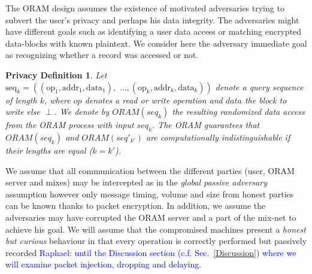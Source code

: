 \documentclass{llncs}
\newtheorem{privdef}{Privacy Definition}
\newcommand{\raphael}[1]{\textcolor{blue}{Raphael: #1}}
\begin{document}
The ORAM design assumes the existence of motivated adversaries trying to subvert the user's privacy and perhaps his data integrity.
The adversaries might have different goals such as identifying a user data access or matching encrypted data-blocks with known plaintext. We consider here the adversary immediate goal as recognizing whether a record was accessed or not. 

\begin{privdef}
Let $\text{seq}_k=((\text{op}_1, \text{addr}_1, \text{data}_1), \text{ ...},(\text{op}_k, \text{addr}_k, \text{data}_k))$ denote a query sequence of length $k$, where $op$ denotes a read or write operation and $data$ the block to write else $
\perp$.
We denote by $ORAM(seq_k)$ the resulting randomized data access from the ORAM process with input $seq_k$.
The ORAM guarantees that $ORAM(seq_k)$ and $ORAM(seq'_{k'})$ are computationally indistinguishable if their lengths are equal ($k=k'$).
\end{privdef}

We assume that all communication between the different parties (user, ORAM server and mixes) may be intercepted as in the \textit{global passive adversary} assumption however only message timing, volume and size from honest parties can be known thanks to packet encryption.
In addition, we assume the adversaries may have corrupted the ORAM server and a part of the mix-net to achieve his goal.
We will assume that the compromised machines present a \textit{honest but curious} behaviour in that every operation is correctly performed but passively recorded \raphael{until the Discussion section (c.f. Sec.~\ref{Discussion}) where we will examine packet injection, dropping and delaying}.
\end{document}
